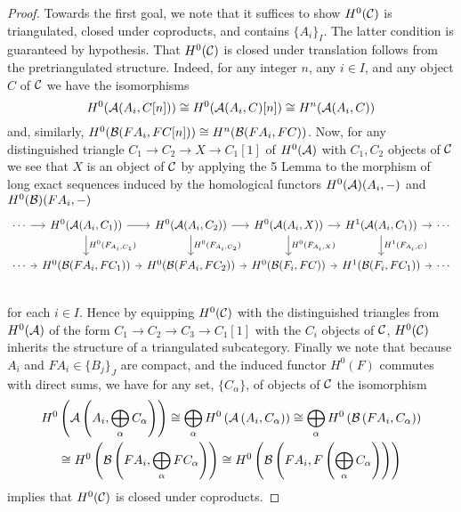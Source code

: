 \begin{proof}
  Towards the first goal, we note that it suffices to show \(H^0(\mathcal{C})\) is triangulated, closed under coproducts, and contains \(\{A_i\}_I\).
  The latter condition is guaranteed by hypothesis.
  That \(H^0(\mathcal{C})\) is closed under translation follows from the pretriangulated structure.  Indeed, for any integer \(n\), any \(i \in I\), and any object \(C\) of \(\mathcal{C}\) we have the isomorphisms
  \[H^0(\mathcal{A}(A_i, C[n])) \cong H^0(\mathcal{A}(A_i, C)[n]) \cong H^n(\mathcal{A}(A_i, C))\]
  and, similarly, \(H^0(\mathcal{B}(FA_i, FC[n])) \cong H^n(\mathcal{B}(FA_i, FC))\).
  Now, for any distinguished triangle \(C_1 \to C_2 \to X \to C_1[1]\) of \(H^0(\mathcal{A})\) with \(C_1, C_2\) objects of \(\mathcal{C}\) we see that \(X\) is an object of \(\mathcal{C}\) by applying the 5 Lemma to the morphism of long exact sequences induced by the homological functors \(H^0(\mathcal{A})(A_i, -)\) and \(H^0(\mathcal{B})(FA_i, -)\)
  \[\begin{tikzcd}[column sep=tiny]
  \cdots \arrow{r} & H^0(\A(A_i, C_1)) \arrow{r}\arrow{d}{H^0(F_{A_i,C_1})} & H^0(\A(A_i, C_2)) \arrow{r}\arrow{d}{H^0(F_{A_i,C_2})} & H^0(\A(A_i, X)) \arrow{r}\arrow{d}{H^0(F_{A_i,X})} & H^1(\A(A_i, C_1)) \arrow{r}\arrow{d}{H^1(F_{A_i, C})} & \cdots\\
  \cdots \arrow{r} & H^0(\B(FA_i, FC_1)) \arrow{r} & H^0(\B(FA_i, FC_2)) \arrow{r} & H^0(\B(F_i, FC)) \arrow{r} & H^1(\B(F_i, FC_1)) \arrow{r}& \cdots\\
  \end{tikzcd}\]
  for each \(i \in I\).
  Hence by equipping \(H^0(\mathcal{C})\) with the distinguished triangles from \(H^0(\mathcal{A})\) of the form \(C_1 \to C_2 \to C_3 \to C_1[1]\) with the \(C_i\) objects of \(\mathcal{C}\), \(H^0(\mathcal{C})\) inherits the structure of a triangulated subcategory.
  Finally we note that because \(A_i\) and \(FA_i \in \{B_j\}_J\) are compact, and the induced functor \(H^0(F)\) commutes with direct sums, we have for any set, \(\{C_\alpha\}\), of objects of \(\mathcal{C}\) the isomorphism
  \begin{gather*}
    H^0\left(\mathcal{A}\left(A_i, \bigoplus_\alpha C_\alpha\right)\right) \cong \bigoplus_\alpha H^0\left(\mathcal{A}\left(A_i, C_\alpha\right)\right) \cong \bigoplus_\alpha H^0\left(\mathcal{B}\left(FA_i, C_\alpha\right)\right)\\
    \cong H^0\left(\mathcal{B}\left(FA_i, \bigoplus_\alpha FC_\alpha\right)\right) \cong H^0\left(\mathcal{B}\left(FA_i, F\left(\bigoplus_\alpha C_\alpha\right)\right)\right)
  \end{gather*}
  implies that \(H^0(\mathcal{C})\) is closed under coproducts.


\end{proof}
